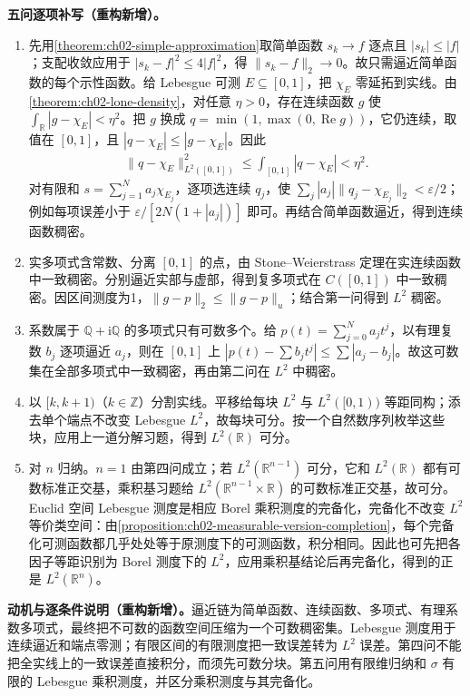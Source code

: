 \documentclass[../../main.tex]{subfiles}
\begin{document}
\begin{solution}
\textbf{五问逐项补写（重构新增）。}
\begin{enumerate}
\item 先用\cref{theorem:ch02-simple-approximation}取简单函数 $s_k\to f$ 逐点且 $|s_k|\leqslant|f|$；支配收敛应用于 $|s_k-f|^2\leqslant4|f|^2$，得 $\|s_k-f\|_2\to0$。故只需逼近简单函数的每个示性函数。给 Lebesgue 可测 $E\subseteq[0,1]$，把 $\chi_E$ 零延拓到实线。由\cref{theorem:ch02-lone-density}，对任意 $\eta>0$，存在连续函数 $g$ 使 $\int_{\mathbb R}|g-\chi_E|<\eta^2$。把 $g$ 换成 $q=\min(1,\max(0,\operatorname{Re}g))$，它仍连续，取值在 $[0,1]$，且 $|q-\chi_E|\leqslant|g-\chi_E|$。因此
\begin{align*}
\|q-\chi_E\|_{L^2([0,1])}^2
\leqslant\int_{[0,1]}|q-\chi_E|<\eta^2.
\end{align*}
对有限和 $s=\sum_{j=1}^Na_j\chi_{E_j}$，逐项选连续 $q_j$，使 $\sum_j|a_j|\|q_j-\chi_{E_j}\|_2<\varepsilon/2$；例如每项误差小于 $\varepsilon/[2N(1+|a_j|)]$ 即可。再结合简单函数逼近，得到连续函数稠密。
\item 实多项式含常数、分离 $[0,1]$ 的点，由 Stone--Weierstrass 定理在实连续函数中一致稠密。分别逼近实部与虚部，得到复多项式在 $C([0,1])$ 中一致稠密。因区间测度为1，$\|g-p\|_2\leqslant\|g-p\|_u$；结合第一问得到 $L^2$ 稠密。
\item 系数属于 $\mathbb Q+\mathrm i\mathbb Q$ 的多项式只有可数多个。给 $p(t)=\sum_{j=0}^Na_jt^j$，以有理复数 $b_j$ 逐项逼近 $a_j$，则在 $[0,1]$ 上 $|p(t)-\sum b_jt^j|\leqslant\sum|a_j-b_j|$。故这可数集在全部多项式中一致稠密，再由第二问在 $L^2$ 中稠密。
\item 以 $[k,k+1)$（$k\in\mathbb Z$）分割实线。平移给每块 $L^2$ 与 $L^2([0,1))$ 等距同构；添去单个端点不改变 Lebesgue $L^2$，故每块可分。按一个自然数序列枚举这些块，应用上一道分解习题，得到 $L^2(\mathbb R)$ 可分。
\item 对 $n$ 归纳。$n=1$ 由第四问成立；若 $L^2(\mathbb R^{n-1})$ 可分，它和 $L^2(\mathbb R)$ 都有可数标准正交基，乘积基习题给 $L^2(\mathbb R^{n-1}\times\mathbb R)$ 的可数标准正交基，故可分。Euclid 空间 Lebesgue 测度是相应 Borel 乘积测度的完备化，完备化不改变 $L^2$ 等价类空间：由\cref{proposition:ch02-measurable-version-completion}，每个完备化可测函数都几乎处处等于原测度下的可测函数，积分相同。因此也可先把各因子等距识别为 Borel 测度下的 $L^2$，应用乘积基结论后再完备化，得到的正是 $L^2(\mathbb R^n)$。
\end{enumerate}
\end{solution}
\begin{remark}
\textbf{动机与逐条件说明（重构新增）。}逼近链为简单函数、连续函数、多项式、有理系数多项式，最终把不可数的函数空间压缩为一个可数稠密集。Lebesgue 测度用于连续逼近和端点零测；有限区间的有限测度把一致误差转为 $L^2$ 误差。第四问不能把全实线上的一致误差直接积分，而须先可数分块。第五问用有限维归纳和 $\sigma$ 有限的 Lebesgue 乘积测度，并区分乘积测度与其完备化。
\end{remark}
\end{document}
